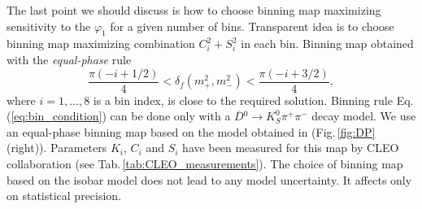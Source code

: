 \documentclass[preprint,aps,showpacs]{revtex4}
\newcommand{\dbkpp}{\ensuremath{\overline{D}{}^0\to K^0_S\pi^+\pi^-}\xspace}
\begin{document}
The last point we should discuss is how to choose binning map maximizing sensitivity to the $\varphi_1$ for a given number of bins. Transparent idea is to choose binning map maximizing combination $C_i^2+S_i^2$ in each bin. Binning map obtained with the {\it equal-phase} rule
\begin{equation}\label{eq:bin_condition}
\frac{\pi(-i+1/2)}{4}<\delta_f\left(m_+^2,m_-^2\right)<\frac{\pi(-i+3/2)}{4},
\end{equation}
where $i=1, \dots, 8$ is a bin index, is close to the required solution. Binning rule Eq.\,(\ref{eq:bin_condition}) can be done only with a \dbkpp decay model. We use an equal-phase binning map based on the model obtained in \cite{Belle_model} (Fig.\,\ref{fig:DP} (right)). Parameters $K_i$, $C_i$ and $S_i$ have been measured for this map by CLEO collaboration \cite{CLEO_phasees} (see Tab.\,\ref{tab:CLEO_measurements}). The choice of binning map based on the isobar model does not lead to any model uncertainty. It affects only on statistical precision.
\end{document}
